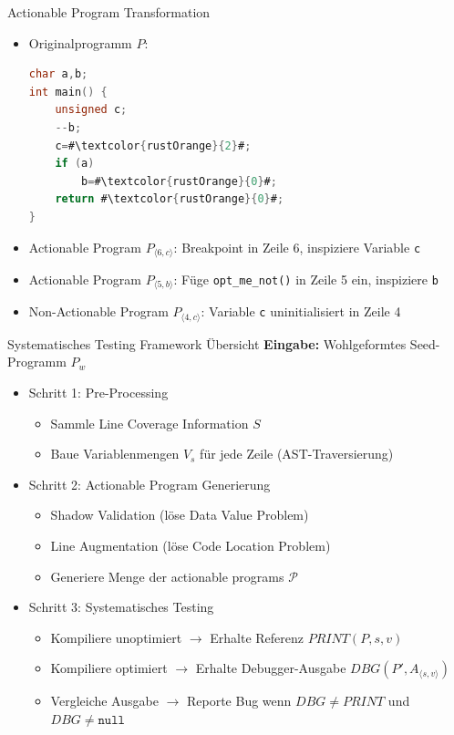 ﻿\documentclass{beamer}
\newcommand{\dingcheck}{{\color{moderngreen}\ding{52}}}
\newcommand{\dingcross}{{\color{modernred}\ding{54}}}
\begin{document}
\begin{frame}[fragile]{Actionable Program Transformation}

  \begin{itemize}
    \item Originalprogramm $P$:
    \begin{lstlisting}[language=C,escapechar=\#]
char a,b;
int main() {
    unsigned c;
    --b;
    c=#\textcolor{rustOrange}{2}#;
    if (a)
        b=#\textcolor{rustOrange}{0}#;
    return #\textcolor{rustOrange}{0}#;
}
  \end{lstlisting}
    \item Actionable Program $P_{\langle 6,c\rangle}$: Breakpoint in Zeile 6, inspiziere Variable \texttt{c} \dingcheck
    \item Actionable Program $P_{\langle 5,b\rangle}$: F\"uge \texttt{opt\_me\_not()} in Zeile 5 ein, inspiziere \texttt{b} \dingcheck
    \item Non-Actionable Program $P_{\langle 4,c\rangle}$: Variable \texttt{c} uninitialisiert in Zeile 4 \dingcross
  \end{itemize}
\end{frame}

\begin{frame}{Systematisches Testing Framework \"Ubersicht}
  \textbf{Eingabe:} Wohlgeformtes Seed-Programm $P_w$
  \vspace{0.3cm}
  \begin{itemize}
    \item Schritt 1: Pre-Processing
      \begin{itemize}
        \item Sammle Line Coverage Information $S$
        \item Baue Variablenmengen $V_s$ f\"ur jede Zeile (AST-Traversierung)
      \end{itemize}
    \item Schritt 2: Actionable Program Generierung
      \begin{itemize}
        \item Shadow Validation (l\"ose Data Value Problem)
        \item Line Augmentation (l\"ose Code Location Problem)
        \item Generiere Menge der actionable programs $\mathcal{P}$
      \end{itemize}
    \item Schritt 3: Systematisches Testing
      \begin{itemize}
        \item Kompiliere unoptimiert $\rightarrow$ Erhalte Referenz $\mathit{PRINT}(P,s,v)$
        \item Kompiliere optimiert $\rightarrow$ Erhalte Debugger-Ausgabe $\mathit{DBG}(P', A_{\langle s,v\rangle})$
        \item Vergleiche Ausgabe $\rightarrow$ Reporte Bug wenn $\mathit{DBG} \neq \mathit{PRINT}$ und $\mathit{DBG} \neq \texttt{null}$
      \end{itemize}
  \end{itemize}
\end{frame}
\end{document}
